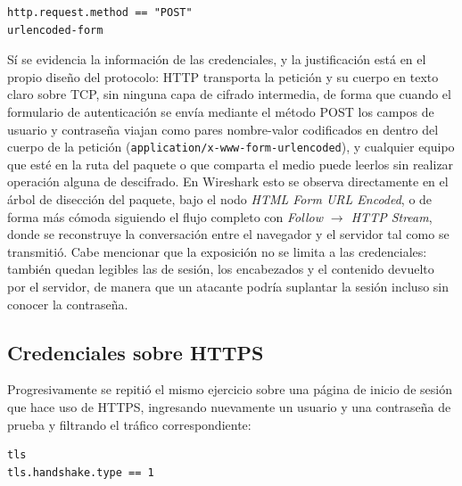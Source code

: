\begin{lstlisting}
http.request.method == "POST"
urlencoded-form
\end{lstlisting}


\begin{analisis}
\end{analisis}

\begin{respuesta}
Sí se evidencia la información de las credenciales, y la justificación está en el propio diseño del protocolo: HTTP transporta la petición y su cuerpo en texto claro sobre TCP, sin ninguna capa de cifrado intermedia, de forma que cuando el formulario de autenticación se envía mediante el método POST los campos de usuario y contraseña viajan como pares nombre-valor codificados en  dentro del cuerpo de la petición (\texttt{application/x-www-form-urlencoded}), y cualquier equipo que esté en la ruta del paquete o que comparta el medio puede leerlos sin realizar operación alguna de descifrado. En Wireshark esto se observa directamente en el árbol de disección del paquete, bajo el nodo \emph{HTML Form URL Encoded}, o de forma más cómoda siguiendo el flujo completo con \emph{Follow $\rightarrow$ HTTP Stream}, donde se reconstruye la conversación entre el navegador y el servidor tal como se transmitió. Cabe mencionar que la exposición no se limita a las credenciales: también quedan legibles las  de sesión, los encabezados y el contenido devuelto por el servidor, de manera que un atacante podría suplantar la sesión incluso sin conocer la contraseña.
\end{respuesta}

\subsection{Credenciales sobre HTTPS}

Progresivamente se repitió el mismo ejercicio sobre una página de inicio de sesión que hace uso de HTTPS, ingresando nuevamente un usuario y una contraseña de prueba y filtrando el tráfico correspondiente:

\begin{lstlisting}
tls
tls.handshake.type == 1
\end{lstlisting}

